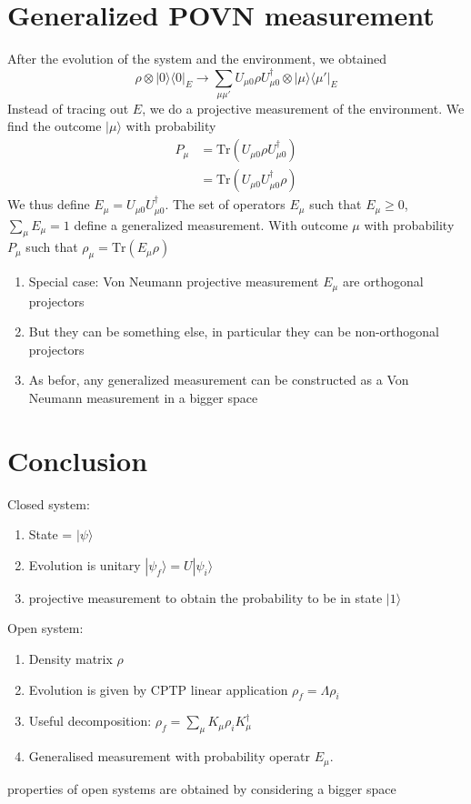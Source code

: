 \documentclass[a4paper]{book}
\theoremstyle{definition}
\theoremstyle{remark}
\begin{document}
\section{Generalized POVN measurement}

After the evolution of the system and the environment, we obtained 
\begin{equation}
    \rho \otimes |0\rangle \langle 0|_E \rightarrow \sum_{\mu\mu'} U_{\mu 0} \rho U^\dagger_{\mu 0} \otimes |\mu \rangle\langle \mu'|_E
\end{equation}
Instead of tracing out $E$, we do a projective measurement of the environment. We find the outcome $|\mu\rangle$ with probability 
\begin{equation}
\begin{aligned}
    P_\mu &= \text{Tr}(U_{\mu 0} \rho U^\dagger_{\mu 0}) \\
    &= \text{Tr}(U_{\mu 0}  U^\dagger_{\mu 0} \rho)    
\end{aligned}
\end{equation}
We thus define $E_\mu = U_{\mu 0}  U^\dagger_{\mu 0}$. The set of operators $E_\mu$ such that $E_\mu \geq 0$, $\sum_\mu E_\mu = 1$ define a generalized measurement. With outcome $\mu$ with probability $P_\mu$ such that $\rho_\mu = \text{Tr}(E_\mu \rho)$ 

\begin{enumerate}
    \item Special case: Von Neumann projective measurement $E_\mu$ are orthogonal projectors 
    \item But they can be something else, in particular they can be non-orthogonal projectors 
    \item As befor, any generalized measurement can be constructed as a Von Neumann measurement in a bigger space 
\end{enumerate}

\section{Conclusion}

Closed system: 
\begin{enumerate}
    \item State = $|\psi\rangle$
    \item Evolution is unitary $|\psi_f\rangle = U|\psi_i\rangle$
    \item projective measurement to obtain the probability to be in state $|1\rangle$
\end{enumerate}
Open system: 
\begin{enumerate}
    \item Density matrix $\rho$
    \item Evolution is given by CPTP linear application $\rho_f = \Lambda \rho_i$
    \item Useful decomposition: $\rho_f = \sum_\mu K_\mu \rho_i K^\dagger _\mu$
    \item Generalised measurement with probability operatr $E_\mu$. 
\end{enumerate}
properties of open systems are obtained by considering a bigger space \par \medskip 
\end{document}
